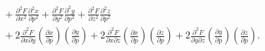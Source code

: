 \begin{Exercise}
\begin{solution}
\begin{align*}
&\quad + \frac{\partial^2 F}{\partial x^2}\frac{\partial^2 x}{\partial p^2} + \frac{\partial^2 F}{\partial y^2}\frac{\partial^2 y}{\partial p^2} + \frac{\partial^2 F}{\partial z^2}\frac{\partial^2 z}{\partial p^2} \\
&\quad + 2\frac{\partial^2 F}{\partial x \partial y}\left(\frac{\partial x}{\partial p}\right) \left(\frac{\partial y}{\partial p}\right) + 2\frac{\partial^2 F}{\partial x \partial z}\left(\frac{\partial x}{\partial p}\right) \left(\frac{\partial z}{\partial p}\right) + 2\frac{\partial^2 F}{\partial y \partial z}\left(\frac{\partial y}{\partial p}\right) \left(\frac{\partial z}{\partial p}\right).
\end{align*}
\end{solution}
\end{Exercise}